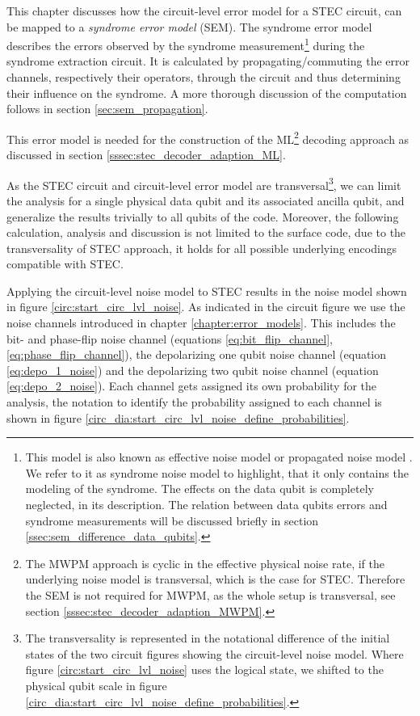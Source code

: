 This chapter discusses how the circuit-level error model for a STEC circuit, can be mapped to a \emph{syndrome error model} (SEM).
The syndrome error model describes the errors observed by the syndrome measurement\footnote{
    This model is also known as effective noise model or propagated noise model \cite{manuel_error_propagation_paper}.
    We refer to it as syndrome noise model to highlight, that it only contains the modeling of the syndrome.
    The effects on the data qubit is completely neglected, in its description.
    The relation between data qubits errors and syndrome measurements will be discussed briefly in section \ref{ssec:sem_difference_data_qubits}.

} during the syndrome extraction circuit.
It is calculated by propagating/commuting the error channels, respectively their operators, through the circuit and thus determining their influence on the syndrome. 
A more thorough discussion of the computation follows in section \ref{sec:sem_propagation}.

This error model is needed for the construction of the ML\footnote{
    The MWPM approach is cyclic in the effective physical noise rate, if the underlying noise model is transversal, which is the case for STEC. 
    Therefore the SEM is not required for MWPM, as the whole setup is transversal, see section \ref{sssec:stec_decoder_adaption_MWPM}.
} decoding approach as discussed in section \ref{sssec:stec_decoder_adaption_ML}.

As the STEC circuit and circuit-level error model are transversal\footnote{
    The transversality is represented in the notational difference of the initial states of the two circuit figures showing the circuit-level noise model. 
    Where figure \ref{circ:start_circ_lvl_noise} uses the logical state, we shifted to the physical qubit scale in figure \ref{circ_dia:start_circ_lvl_noise_define_probabilities}. 
}, 
we can limit the analysis for a single physical data qubit and its associated ancilla qubit, 
and generalize the results trivially to all qubits of the code. 
Moreover, the following calculation, analysis and discussion is not limited to the surface code, due to the transversality of STEC approach, 
it holds for all possible underlying encodings compatible with STEC. 

Applying the circuit-level noise model to STEC results in the noise model shown in figure \ref{circ:start_circ_lvl_noise}.
As indicated in the circuit figure we use the noise channels introduced in chapter \ref{chapter:error_models}.
This includes the bit- and phase-flip noise channel (equations \eqref{eq:bit_flip_channel}, \eqref{eq:phase_flip_channel}), 
the depolarizing one qubit noise channel (equation \eqref{eq:depo_1_noise}) and the depolarizing two qubit noise channel (equation \eqref{eq:depo_2_noise}).
Each channel gets assigned its own probability for the analysis, the notation to identify the probability assigned to each channel is shown in figure \ref{circ_dia:start_circ_lvl_noise_define_probabilities}. 

